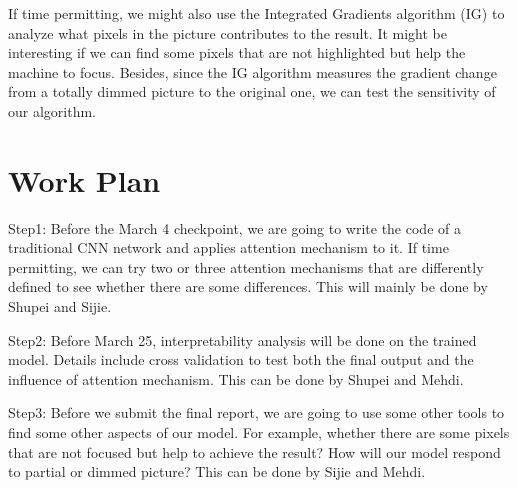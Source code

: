 \documentclass[12pt]{article}
\begin{document}
If time permitting, we might also use the Integrated Gradients algorithm (IG) \cite{sundararajan2017axiomatic} to analyze what pixels in the picture contributes to the result. 
It might be interesting if we can find some pixels that are not highlighted but help the machine to focus. 
Besides, since the IG algorithm measures the gradient change from a totally dimmed picture to the original one, we can test the sensitivity of our algorithm.

\section{Work Plan}

Step1: Before the March 4 checkpoint, we are going to write the code of a traditional CNN network and applies attention mechanism to it. 
If time permitting, we can try two or three attention mechanisms that are differently defined to see whether there are some differences. 
This will mainly be done by Shupei and Sijie.

Step2: Before March 25, interpretability analysis will be done on the trained model. Details include cross validation to test both the final output and the influence of attention mechanism. 
This can be done by Shupei and Mehdi.

Step3: Before we submit the final report, we are going to use some other tools to find some other aspects of our model. 
For example, whether there are some pixels that are not focused but help to achieve the result? How will our model respond to partial or dimmed picture? This can be done by Sijie and Mehdi.

\newpage



\end{document}
